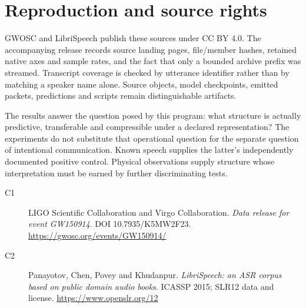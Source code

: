 \section{Reproduction and source rights}

GWOSC and LibriSpeech publish these sources under CC BY 4.0. The accompanying release records source landing pages, file/member hashes, retained native axes and sample rates, and the fact that only a bounded archive prefix was streamed. Transcript coverage is checked by utterance identifier rather than by matching a speaker name alone. Source objects, model checkpoints, emitted packets, predictions and scripts remain distinguishable artifacts.

The results answer the question posed by this program: what structure is actually predictive, transferable and compressible under a declared representation? The experiments do not substitute that operational question for the separate question of intentional communication. Known speech supplies the latter's independently documented positive control. Physical observations supply structure whose interpretation must be earned by further discriminating tests.

\begin{description}
\item[C1] LIGO Scientific Collaboration and Virgo Collaboration. \emph{Data release for event GW150914}. DOI 10.7935/K5MW2F23. \url{https://gwosc.org/events/GW150914/}
\item[C2] Panayotov, Chen, Povey and Khudanpur. \emph{LibriSpeech: an ASR corpus based on public domain audio books}. ICASSP 2015; SLR12 data and license. \url{https://www.openslr.org/12}
\end{description}
